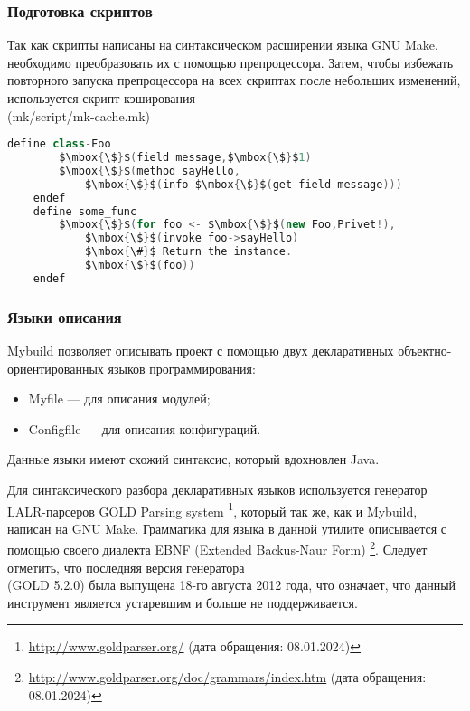 \subsubsection{Подготовка скриптов}
Так как скрипты написаны на синтаксическом расширении языка GNU Make, необходимо преобразовать их с помощью препроцессора. Затем, чтобы избежать повторного запуска препроцессора на всех скриптах после небольших изменений, используется скрипт кэширования \\(mk/script/mk-cache.mk)
\begin{lstlisting}[caption=Пример определения класса, language=Java, frame=single, breaklines, mathescape]
    define class-Foo
        $\mbox{\$}$(field message,$\mbox{\$}$1)
        $\mbox{\$}$(method sayHello,
            $\mbox{\$}$(info $\mbox{\$}$(get-field message)))
    endef
    define some_func
        $\mbox{\$}$(for foo <- $\mbox{\$}$(new Foo,Privet!),
            $\mbox{\$}$(invoke foo->sayHello)
            $\mbox{\#}$ Return the instance.
            $\mbox{\$}$(foo))
    endef
\end{lstlisting}

\subsubsection{Языки описания}
Mybuild позволяет описывать проект с помощью двух декларативных объектно-ориентированных языков программирования:
\begin{itemize}
	\item Myfile --- для описания модулей;
	\item Configfile --- для описания конфигураций.
\end{itemize}
Данные языки имеют схожий синтаксис, который вдохновлен Java.

Для синтаксического разбора декларативных языков используется генератор LALR-парсеров \cite{10.5555/1951778} GOLD Parsing system \footnote{\href{http://www.goldparser.org/}{http://www.goldparser.org/} (дата обращения: 08.01.2024)}, который так же, как и Mybuild, написан на GNU Make. Грамматика для языка в данной утилите описывается с помощью своего диалекта EBNF (Extended Backus-Naur Form) \footnote {\href{http://www.goldparser.org/doc/grammars/index.htm}{http://www.goldparser.org/doc/grammars/index.htm} (дата обращения: 08.01.2024)}. Следует отметить, что последняя версия генератора \\ (GOLD 5.2.0) была выпущена 18-го августа 2012 года, что означает, что данный инструмент является устаревшим и больше не поддерживается.


